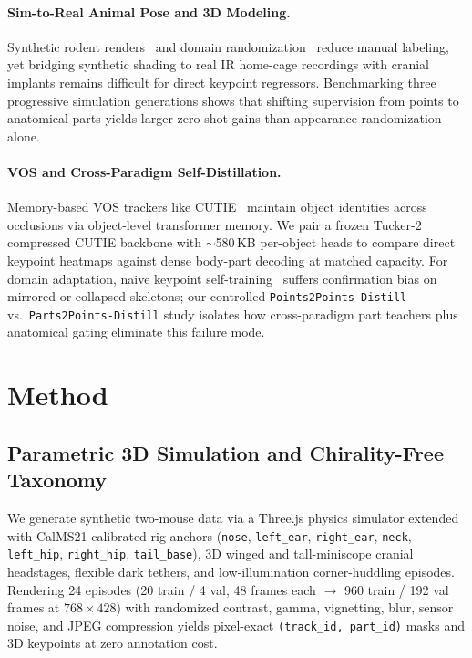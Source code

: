 \documentclass[10pt,twocolumn,letterpaper]{article}
\begin{document}
\paragraph{Sim-to-Real Animal Pose and 3D Modeling.} Synthetic rodent renders~\cite{bolanos2021three,dunn2021geometric,karashchuk2021anipose} and domain randomization~\cite{tobin2017domain} reduce manual labeling, yet bridging synthetic shading to real IR home-cage recordings with cranial implants remains difficult for direct keypoint regressors. Benchmarking three progressive simulation generations shows that shifting supervision from points to anatomical parts yields larger zero-shot gains than appearance randomization alone.

\paragraph{VOS and Cross-Paradigm Self-Distillation.} Memory-based VOS trackers like CUTIE~\cite{cheng2024putting} maintain object identities across occlusions via object-level transformer memory. We pair a frozen Tucker-2 compressed CUTIE backbone with $\sim$580\,KB per-object heads to compare direct keypoint heatmaps against dense body-part decoding at matched capacity. For domain adaptation, naive keypoint self-training~\cite{xie2020self,sohn2020fixmatch,ye2024superanimal} suffers confirmation bias on mirrored or collapsed skeletons; our controlled \texttt{Points2Points-Distill} vs.\ \texttt{Parts2Points-Distill} study isolates how cross-paradigm part teachers plus anatomical gating eliminate this failure mode.

\section{Method}

\subsection{Parametric 3D Simulation and Chirality-Free Taxonomy}
\label{sec:dataset}

We generate synthetic two-mouse data via a Three.js physics simulator extended with CalMS21-calibrated rig anchors (\texttt{nose}, \texttt{left\_ear}, \texttt{right\_ear}, \texttt{neck}, \texttt{left\_hip}, \texttt{right\_hip}, \texttt{tail\_base}), 3D winged and tall-miniscope cranial headstages, flexible dark tethers, and low-illumination corner-huddling episodes. Rendering 24 episodes (20 train / 4 val, 48 frames each $\to$ 960 train / 192 val frames at $768\times 428$) with randomized contrast, gamma, vignetting, blur, sensor noise, and JPEG compression yields pixel-exact \texttt{(track\_id, part\_id)} masks and 3D keypoints at zero annotation cost.
\end{document}
